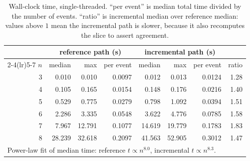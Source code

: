 \begin{table}[htbp]
\centering
\begin{tabular}{rrrrrrrr}
\toprule
& \multicolumn{3}{c}{reference path (s)} & \multicolumn{3}{c}{incremental path (s)} & \\
\cmidrule(lr){2-4}\cmidrule(lr){5-7}
$n$ & median & max & per event & median & max & per event & ratio \\
\midrule
3 & 0.010 & 0.010 & 0.0097 & 0.012 & 0.013 & 0.0124 & 1.28 \\
4 & 0.105 & 0.165 & 0.0154 & 0.148 & 0.176 & 0.0216 & 1.40 \\
5 & 0.529 & 0.775 & 0.0279 & 0.798 & 1.092 & 0.0394 & 1.51 \\
6 & 2.286 & 3.335 & 0.0548 & 3.622 & 4.776 & 0.0785 & 1.58 \\
7 & 7.967 & 12.791 & 0.1077 & 14.619 & 19.779 & 0.1783 & 1.83 \\
8 & 28.239 & 32.618 & 0.2097 & 41.563 & 52.905 & 0.3012 & 1.47 \\
\midrule
\multicolumn{8}{l}{Power-law fit of median time: reference $t \propto n^{8.0}$, incremental $t \propto n^{8.3}$.} \\
\bottomrule
\end{tabular}
\caption{Wall-clock time, single-threaded. ``per event'' is median total time divided by the number of events. ``ratio'' is incremental median over reference median: values above $1$ mean the incremental path is slower, because it also recomputes the slice to assert agreement.}
\label{tab:timing}
\end{table}
